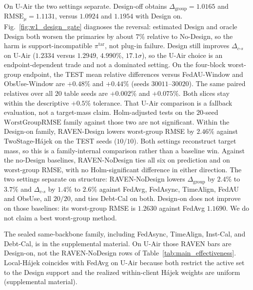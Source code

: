 \documentclass[letterpaper,journal]{IEEEtran}
\begin{document}
On U-Air the two settings separate.  Design-off obtains
$\Delta_{\mathrm{group}}=1.0165$ and $\mathrm{RMSE}_{\mu}=1.1131$,
versus $1.0924$ and $1.1954$ with Design on.  Fig.~\ref{fig:w1_design_gate}
diagnoses the reversal: estimated Design and oracle Design both worsen the
primaries by about $7\%$ relative to No-Design, so the harm is
support-incompatible $\pi^{\mathrm{tar}}$, not plug-in failure.
Design still improves $\Delta_{c\text{-}s}$ on U-Air ($1.2334$ versus
$1.2949$, $4.990\%$, $17.1\sigma$), so the U-Air choice is an
endpoint-dependent trade and not a dominated setting.  On the
four-block worst-group endpoint, the TEST mean relative differences versus
FedAU-Window and ObsUse-Window are $+0.48\%$ and $+0.44\%$
(seeds $30011$--$30020$).
The same paired relatives over all $20$ table seeds are $+0.002\%$ and
$+0.075\%$.
Both slices stay within the descriptive $+0.5\%$ tolerance.  That U-Air comparison is a
fallback evaluation, not a target-mass claim.
Holm-adjusted tests on the $20$-seed $\mathrm{WorstGroupRMSE}$ family against
those two are not significant.
Within the Design-on family, RAVEN-Design lowers worst-group RMSE by $2.46\%$
against TwoStage-H\'ajek on the TEST seeds ($10/10$).  Both settings reconstruct
target mass, so this is a family-internal comparison rather than a baseline win.
Against the no-Design baselines, RAVEN-NoDesign ties all six on prediction and
on worst-group RMSE, with no Holm-significant difference in either direction.
The two settings separate on structure: RAVEN-NoDesign lowers
$\Delta_{\mathrm{group}}$ by $2.4\%$ to $3.7\%$ and $\Delta_{c\text{-}s}$ by
$1.4\%$ to $2.6\%$ against FedAvg, FedAsync, TimeAlign, FedAU and ObsUse, all
$20/20$, and ties Debt-Cal on both.  Design-on does not improve on those
baselines: its worst-group RMSE is $1.2630$ against FedAvg $1.1690$.  We do not
claim a best worst-group method.

The sealed same-backbone family, including FedAsync, TimeAlign,
Inst-Cal, and Debt-Cal, is in the supplemental material.  On U-Air
those RAVEN bars are Design-on, not the RAVEN-NoDesign rows of
Table~\ref{tab:main_effectiveness}.  Local-H\'ajek coincides with
FedAvg on U-Air because both restrict the active set to the Design support and
the realized within-client H\'ajek weights are uniform (supplemental material).
\end{document}
